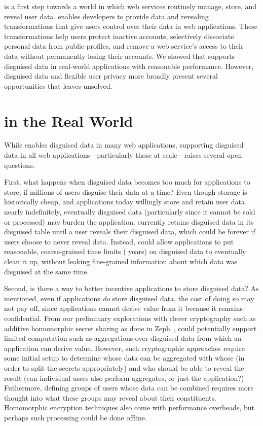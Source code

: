 %
\sys is a first step towards a world in which web services routinely manage,
store, and reveal \xxed user data.
%
\sys enables developers to provide data \xxing and revealing transformations
that give users control over their data in web applications.
%
These transformations help users protect inactive accounts, selectively
dissociate personal data from public profiles, and remove a web service's access
to their data without permanently losing their accounts.
%
We showed that \sys supports disguised data in real-world applications with
reasonable performance. However, disguised data and flexible user privacy more
broadly present several opportunities that \sys leaves unsolved.
%

\section{\sys in the Real World}

While \sys enables disguised data in many web applications, supporting disguised
data in all web applications---particularly those at scale---raises several
open questions. 

%
First, what happens when disguised data becomes too much for applications
to store, if \eg millions of users disguise their data at a time?  
%
Even though storage is historically cheap, and applications today willingly
store and retain user data nearly indefinitely, eventually disguised data
(particularly since it cannot be sold or processed) may burden the application.
%
\sys currently retains disguised data in its disguised table until a user reveals
their disguised data, which could be forever if users choose to never reveal
data.
%
Instead, \sys could allow applications to put reasonable, coarse-grained time
limits ( years) on disguised data to eventually clean it up, without
leaking fine-grained information about which data was disguised at the same
time.
%

%
Second, is there a way to better incentive applications to store disguised data?
As mentioned, even if applications \emph{do} store disguised data, the cost of
doing so may not pay off, since applications cannot derive value from it because
it remains confidential. 
%
From our preliminary explorations with clever cryptography such as additive
homomorphic secret sharing as done in Zeph~\cite{zeph}, \sys could potentially
support limited computation such as aggregations over disguised data from which
an application can derive value.
%
However, such cryptographic approaches require some initial setup to determine
whose data can be aggregated with whose (in order to split the secrets
appropriately) and who should be able to reveal the result (can individual users
also perform aggregates, or just the application?)
Futhermore, defining groups of users whose data can be combined requires more thought into what these groups may reveal about their constituents.
%
Homomorphic encryption techniques also come with performance overheads, but
perhaps such processing could be done offline.

